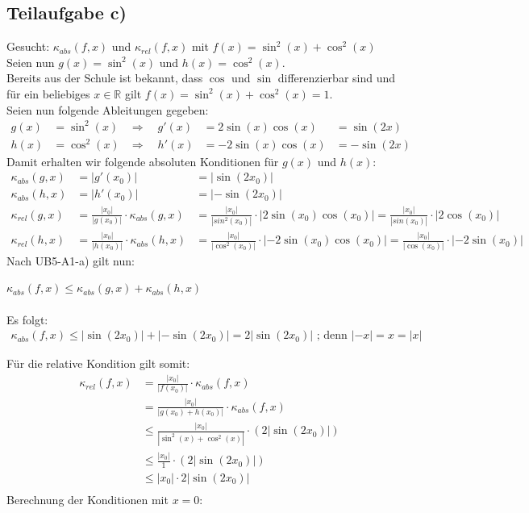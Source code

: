 \documentclass{llncs}
\begin{document}
\subsection*{Teilaufgabe c)}
Gesucht: $\kappa_{abs}(f,x)$ und $\kappa_{rel}(f,x)$ mit $f(x)= \sin^2(x) + \cos^2(x)$\\
Seien nun $g(x)=\sin^2(x)$ und $h(x)=\cos^2(x)$.\\
Bereits aus der Schule ist bekannt, dass $\cos$ und $\sin$ differenzierbar sind und für ein beliebiges $x \in \mathbb{R}$ gilt $f(x)= \sin^2(x) + \cos^2(x)=1$.\\
Seien nun folgende Ableitungen gegeben:
\begin{align*}
g(x)&=\sin^2(x)  &\Rightarrow \quad g'(x)&= 2\sin(x)\cos(x) &=\sin(2x)\\
h(x)&=\cos^2(x)  &\Rightarrow \quad h'(x)&= -2\sin(x)\cos(x) &=-\sin(2x)
\end{align*}
Damit erhalten wir folgende absoluten Konditionen für $g(x)$ und $h(x)$:\\
\begin{align*}
\kappa_{abs}(g,x) &=|g'(x_0)| &= |\sin(2x_0)| \\
\kappa_{abs}(h,x) &=|h'(x_0)| &= |-\sin(2x_0)| \\
\kappa_{rel}(g,x) &= \frac{|x_0|}{|g(x_0)|}\cdot\kappa_{abs}(g,x)  &= \frac{|x_0|}{|sin^2(x_0)|}\cdot|2\sin(x_0)\cos(x_0)| = \frac{|x_0|}{|sin(x_0)|}\cdot|2\cos(x_0)|\\
\kappa_{rel}(h,x) &=\frac{|x_0|}{|h(x_0)|}\cdot\kappa_{abs}(h,x)  &= \frac{|x_0|}{|\cos^2(x_0)|}\cdot|-2\sin(x_0)\cos(x_0)| = \frac{|x_0|}{|\cos(x_0)|}\cdot|-2\sin(x_0)|
\end{align*}
Nach UB5-A1-a) gilt nun: 

$\kappa_{abs}(f,x)\le \kappa_{abs}(g,x) + \kappa_{abs}(h,x) $\\\\
Es folgt:\\
\begin{align*}
\kappa_{abs}(f,x)\le |\sin(2x_0)| + |-\sin(2x_0)| = 2|\sin(2x_0)|  \text{ ; denn } |-x|=x=|x|
\end{align*}


Für die relative Kondition gilt somit:
\begin{align*}
\kappa_{rel}(f,x) &= \frac{|x_0|}{|f(x_0)|}\cdot\kappa_{abs}(f,x)\\ 
&= \frac{|x_0|}{|g(x_0)+h(x_0)|}\cdot\kappa_{abs}(f,x)\\
&\le  \frac{|x_0|}{|\sin^2(x)+\cos^2(x)|}\cdot (2|\sin(2x_0)|)\\
&\le  \frac{|x_0|}{1}\cdot (2|\sin(2x_0)|)\\
&\le  |x_0|\cdot 2|\sin(2x_0)|\\
\end{align*} 
Berechnung der Konditionen mit $x=0$:
\end{document}
